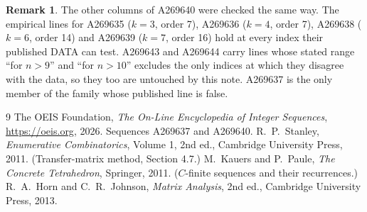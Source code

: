 \documentclass[11pt,a4paper]{article}
\theoremstyle{plain}
\theoremstyle{definition}
\newtheorem{remark}[theorem]{Remark}
\begin{document}
\begin{remark}
The other columns of A269640 were checked the same way. The empirical lines for
A269635 ($k=3$, order 7), A269636 ($k=4$, order 7), A269638 ($k=6$, order 14) and
A269639 ($k=7$, order 16) hold at every index their published DATA can test. A269643 and
A269644 carry lines whose stated range ``for $n>9$'' and ``for $n>10$'' excludes the only
indices at which they disagree with the data, so they too are untouched by this note.
A269637 is the only member of the family whose published line is false.
\end{remark}

\begin{thebibliography}{9}
 The OEIS Foundation, \emph{The On-Line Encyclopedia of Integer
Sequences}, \url{https://oeis.org}, 2026. Sequences A269637 and A269640.
 R.~P.~Stanley, \emph{Enumerative Combinatorics}, Volume 1, 2nd ed.,
Cambridge University Press, 2011. (Transfer-matrix method, Section 4.7.)
 M.~Kauers and P.~Paule, \emph{The Concrete Tetrahedron}, Springer, 2011.
($C$-finite sequences and their recurrences.)
 R.~A.~Horn and C.~R.~Johnson, \emph{Matrix Analysis}, 2nd ed., Cambridge
University Press, 2013.
\end{thebibliography}
\end{document}
